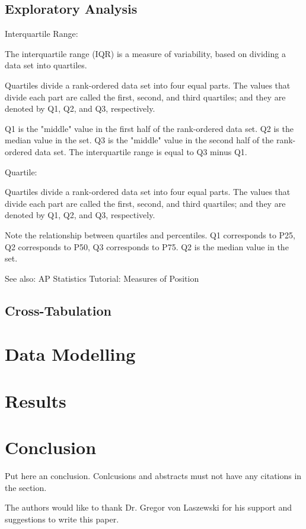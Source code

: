 \documentclass[sigconf]{acmart}
\begin{document}
\subsection{Exploratory Analysis}

Interquartile Range:

The interquartile range (IQR) is a measure of variability, based on dividing a data set into quartiles.

Quartiles divide a rank-ordered data set into four equal parts. The values that divide each part are called the first, second, and third quartiles; and they are denoted by Q1, Q2, and Q3, respectively.

Q1 is the "middle" value in the first half of the rank-ordered data set.
Q2 is the median value in the set.
Q3 is the "middle" value in the second half of the rank-ordered data set.
The interquartile range is equal to Q3 minus Q1.\cite{stat-trek-statistics}

Quartile:

Quartiles divide a rank-ordered data set into four equal parts. The values that divide each part are called the first, second, and third quartiles; and they are denoted by Q1, Q2, and Q3, respectively.

Note the relationship between quartiles and percentiles. Q1 corresponds to P25, Q2 corresponds to P50, Q3 corresponds to P75. Q2 is the median value in the set.

See also:  	AP Statistics Tutorial: Measures of Position



\subsection{Cross-Tabulation}

\section{Data Modelling}

\section{Results}



\section{Conclusion}

Put here an conclusion. Conlcusions and abstracts must not have any
citations in the section.


\begin{acks}

  The authors would like to thank Dr. Gregor von Laszewski for his
  support and suggestions to write this paper.

\end{acks}


 
\end{document}
